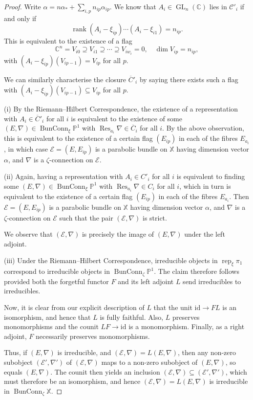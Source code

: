 \documentclass[10pt,a4paper]{amsart}
\DeclareMathOperator{\BunConn}{BunConn}
\newcommand{\C}{\mathbb C}
\newcommand{\E}{\mathcal E}
\DeclareMathOperator{\GL}{GL}
\newcommand{\PP}{\mathbb P}
\DeclareMathOperator{\Res}{Res}
\newcommand{\XX}{\mathbb X}
\DeclareMathOperator{\rank}{rank}
\DeclareMathOperator{\rep}{rep}
\begin{document}
\begin{proof}
Write $\alpha=n\alpha_\ast+\sum_{i,p}n_{ip}\alpha_{ip}$. We know that $A_i\in\GL_n(\C)$ lies in $\mathcal C'_i$ if and only if
\[ \rank(A_i-\xi_{ip})\cdots(A_i-\xi_{i1}) = n_{ip}. \]
This is equivalent to the existence of a flag
\[ \C^n = V_{i0} \supseteq V_{i1} \supseteq \cdots \supseteq V_{iw_i} = 0, \quad \dim V_{ip}=n_{ip}, \]
with $(A_i-\xi_{ip})(V_{ip-1})=V_{ip}$ for all $p$.

We can similarly characterise the closure $\overline C'_i$ by saying there exists such a flag with $(A_i-\xi_{ip})(V_{ip-1})\subseteq V_{ip}$ for all $p$.

(i) By the Riemann--Hilbert Correspondence, the existence of a representation with $A_i\in\overline C'_i$ for all $i$ is equivalent to the existence of some $(E,\nabla)\in\BunConn_\xi\PP^1$ with $\Res_{a_i}\nabla\in\overline C_i$ for all $i$. By the above observation, this is equivalent to the existence of a certain flag $(E_{ip})$ in each of the fibres $E_{a_i}$, in which case $\E=(E,E_{ip})$ is a parabolic bundle on $\XX$ having dimension vector $\alpha$, and $\nabla$ is a $\zeta$-connection on $\E$.

(ii) Again, having a representation with $A_i\in C'_i$ for all $i$ is equivalent to finding some $(E,\nabla)\in\BunConn_\xi\PP^1$ with $\Res_{a_i}\nabla\in C_i$ for all $i$, which in turn is equivalent to the existence of a certain flag $(E_{ip})$ in each of the fibres $E_{a_i}$. Then $\E=(E,E_{ip})$ is a parabolic bundle on $\XX$ having dimension vector $\alpha$, and $\nabla$ is a $\zeta$-connection on $\E$ such that the pair $(\E,\nabla)$ is strict.

We observe that $(\E,\nabla)$ is precisely the image of $(E,\nabla)$ under the left adjoint.

(iii) Under the Riemann--Hilbert Correspondence, irreducible objects in $\rep_\xi\pi_1$ correspond to irreducible objects in $\BunConn_\zeta\PP^1$. The claim therefore follows provided both the forgetful functor $F$ and its left adjoint $L$ send irreducibles to irreducibles.

Now, it is clear from our explicit description of $L$ that the unit $\mathrm{id}\to FL$ is an isomorphism, and hence that $L$ is fully faithful. Also, $L$ preserves monomorphisms and the counit $LF\to\mathrm{id}$ is a monomorphism. Finally, as a right adjoint, $F$ necessarily preserves monomorphisms.

Thus, if $(E,\nabla)$ is irreducible, and $(\E,\nabla)=L(E,\nabla)$, then any non-zero subobject $(\E',\nabla')$ of $(\E,\nabla)$ maps to a non-zero subobject of $(E,\nabla)$, so equals $(E,\nabla)$. The counit then yields an inclusion $(\E,\nabla)\subseteq(\E',\nabla')$, which must therefore be an isomorphism, and hence $(\E,\nabla)=L(E,\nabla)$ is irreducible in $\BunConn_\zeta\XX$.


\end{proof}
\end{document}
